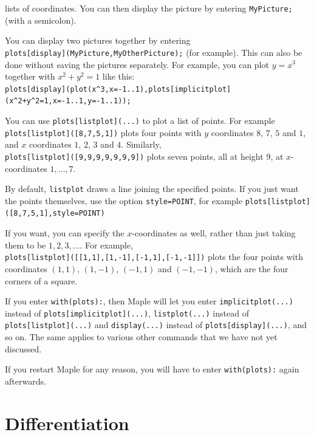 \documentclass{amsart}
\begin{document}
\begin{secenum}
  lists of coordinates.  You can then display the picture by
  entering \verb~MyPicture;~ (with a semicolon).  
%
 \item\label{display}
  You can display two pictures together by entering \\
  \verb~plots[display](MyPicture,MyOtherPicture);~ (for 
  example).  This can also be done without saving the
  pictures separately.  For example, you can plot $y=x^3$
  together with $x^2+y^2=1$ like this:\\
  \verb~plots[display](plot(x^3,x=-1..1),plots[implicitplot](x^2+y^2=1,x=-1..1,y=-1..1));~
%
 \item\label{listplot}
  You can use \verb~plots[listplot](...)~ to plot a list of
  points.  For example \verb~plots[listplot]([8,7,5,1])~
  plots four points with $y$ coordinates $8$, $7$, $5$ and
  $1$, and $x$ coordinates $1$, $2$, $3$ and $4$. 
  Similarly, \\
  \verb~plots[listplot]([9,9,9,9,9,9,9])~ plots
  seven points, all at height $9$, at $x$-coordinates
  $1,\dotsc,7$. 
%
 \item\label{listplotstyle}
  By default, \verb~listplot~ draws a line joining the
  specified points.  If you just want the points themselves,
  use the option \verb~style=POINT~, for example 
  \verb~plots[listplot]([8,7,5,1],style=POINT)~
%
 \item\label{listplotgen}
  If you want, you can specify the $x$-coordinates as well,
  rather than just taking them to be $1,2,3,\dotsc$.  For
  example, \\
  \verb~plots[listplot]([[1,1],[1,-1],[-1,1],[-1,-1]])~
  plots the four points with coordinates $(1,1)$, $(1,-1)$,
  $(-1,1)$ and $(-1,-1)$, which are the four corners of a
  square. 
%
 \item\label{withplots}
  If you enter \verb~with(plots):~, then Maple will let you
  enter \verb~implicitplot(...)~ instead of
  \verb~plots[implicitplot](...)~, \verb~listplot(...)~
  instead of \verb~plots[listplot](...)~  and
  \verb~display(...)~ instead of \verb~plots[display](...)~,
  and so on.  The same applies to various other commands
  that we have not yet discussed. 
%
 \item\label{reloadplots}
  If you restart Maple for any reason, you will
  have to enter \verb~with(plots):~ again afterwards. 
\end{secenum}

\section{Differentiation}\label{sec-diff}
\end{document}
